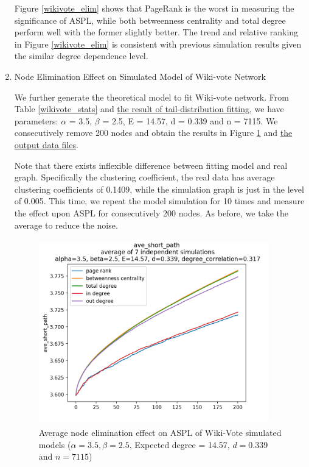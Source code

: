 \documentclass{article}
\begin{document}
\begin{enumerate}
\par Figure \ref{wikivote_elim} shows that PageRank is the worst in measuring the significance of ASPL, while both betweenness centrality and total degree perform well with the former slightly better. The trend and relative ranking in Figure \ref{wikivote_elim} is consistent with previous simulation results given the similar degree dependence level. \\ 

\item Node Elimination Effect on Simulated Model of Wiki-vote Network\\

\par We further generate the theoretical model to fit Wiki-vote network. From Table \ref{wikivote_stats} and \hyperlink{powerlaw_fit}{the result of tail-distribution fitting}, we have parameters:  $\alpha$ = 3.5, $\beta$ = 2.5,  E = 14.57, d = 0.339 and n = 7115.  We consecutively remove 200 nodes and obtain the results in Figure \ref{wikisim} and \href{https://github.com/leahwu/DCM_simulaiton_and_analysis/tree/master/output_data/models3_wiki_vote_simulation}{the output data files}.
\par Note that there exists inflexible difference between fitting model and real graph. Specifically the clustering coefficient, the real data has average clustering coefficients of 0.1409, while the simulation graph is just in the level of 0.005. This time, we repeat the model simulation for 10 times and measure the effect upon ASPL for consecutively 200 nodes. As before, we take the average to reduce the noise. 

\begin{figure}[!htbp]
\centering\includegraphics[width=10cm, height=8cm]{final_images/wikisim.png}
\caption{\label{wikisim} Average node elimination effect on ASPL of Wiki-Vote simulated models ($\alpha= 3.5, \beta=2.5$, Expected degree = 14.57, $d=0.339$ and $n = 7115$)}
\end{figure}


\end{enumerate}
\end{document}
